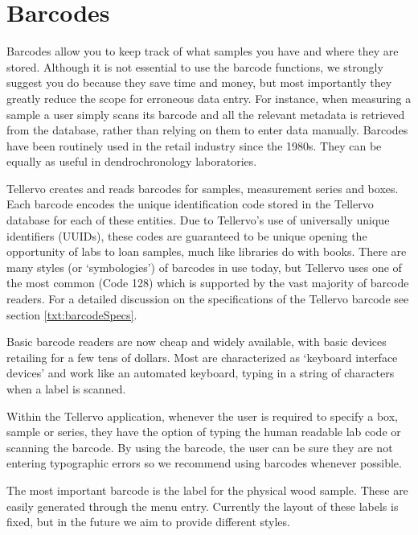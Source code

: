 \section{Barcodes}
\label{txt:barcodes}

Barcodes allow you to keep track of what samples you have and where they are stored.  Although it is not essential to use the barcode functions, we strongly suggest you do because they save time and money, but most importantly they greatly reduce the scope for erroneous data entry.  For instance, when measuring a sample a user simply scans its barcode and all the relevant metadata is retrieved from the database, rather than relying on them to enter data manually.  Barcodes have been routinely used in the retail industry since the 1980s.  They can be equally as useful in dendrochronology laboratories.

Tellervo creates and reads barcodes for samples, measurement series and boxes.  Each barcode encodes the unique identification code stored in the Tellervo database for each of these entities.  Due to Tellervo's use of universally unique identifiers (UUIDs), these codes are guaranteed to be unique opening the opportunity of labs to loan samples, much like libraries do with books.  There are many styles (or `symbologies') of barcodes in use today, but Tellervo uses one of the most common (Code 128) which is supported by the vast majority of barcode readers.  For a detailed discussion on the specifications of the Tellervo barcode see section \ref{txt:barcodeSpecs}.

Basic barcode readers are now cheap and widely available, with basic devices retailing for a few tens of dollars.  Most are characterized as `keyboard interface devices' and work like an automated keyboard, typing in a string of characters when a label is scanned.  

Within the Tellervo application, whenever the user is required to specify a box, sample or series, they have the option of typing the human readable lab code or scanning the barcode. By using the barcode, the user can be sure they are not entering typographic errors so we recommend using barcodes whenever possible. 

The most important barcode is the label for the physical wood sample.  These are easily generated through the  menu entry.  Currently the layout of these labels is fixed, but in the future we aim to provide different styles.  


